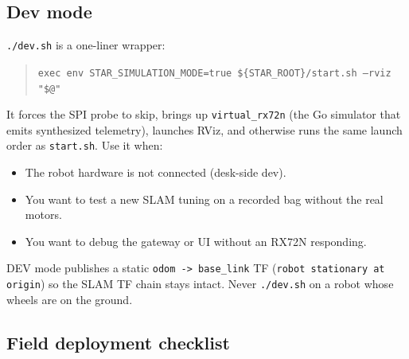 \subsection{Dev mode}

\texttt{./dev.sh} is a one-liner wrapper:

\begin{quote}\small
\texttt{exec env STAR\_SIMULATION\_MODE=true \$\{STAR\_ROOT\}/start.sh --rviz "\$@"}
\end{quote}

It forces the SPI probe to skip, brings up \texttt{virtual\_rx72n}
(the Go simulator that emits synthesized telemetry), launches RViz,
and otherwise runs the same launch order as \texttt{start.sh}. Use it
when:

\begin{itemize}
  \item The robot hardware is not connected (desk-side dev).
  \item You want to test a new SLAM tuning on a recorded bag without
        the real motors.
  \item You want to debug the gateway or UI without an RX72N
        responding.
\end{itemize}

DEV mode publishes a static \texttt{odom -> base\_link} TF
(\texttt{robot stationary at origin}) so the SLAM TF chain stays
intact. Never \texttt{./dev.sh} on a robot whose wheels are on the
ground.

\subsection{Field deployment checklist}

